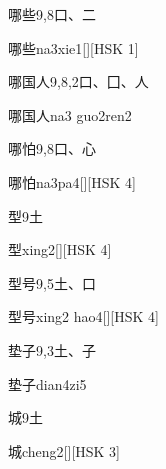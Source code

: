 \begin{entry}{哪些}{9,8}{⼝、⼆}
  \begin{phonetics}{哪些}{na3xie1}[][HSK 1]
  \end{phonetics}
\end{entry}

\begin{entry}{哪国人}{9,8,2}{⼝、⼞、⼈}
  \begin{phonetics}{哪国人}{na3 guo2ren2}
  \end{phonetics}
\end{entry}

\begin{entry}{哪怕}{9,8}{⼝、⼼}
  \begin{phonetics}{哪怕}{na3pa4}[][HSK 4]
  \end{phonetics}
\end{entry}

\begin{entry}{型}{9}{⼟}
  \begin{phonetics}{型}{xing2}[][HSK 4]
  \end{phonetics}
\end{entry}

\begin{entry}{型号}{9,5}{⼟、⼝}
  \begin{phonetics}{型号}{xing2 hao4}[][HSK 4]
  \end{phonetics}
\end{entry}

\begin{entry}{垫子}{9,3}{⼟、⼦}
  \begin{phonetics}{垫子}{dian4zi5}
  \end{phonetics}
\end{entry}

\begin{entry}{城}{9}{⼟}
  \begin{phonetics}{城}{cheng2}[][HSK 3]
  \end{phonetics}
\end{entry}

